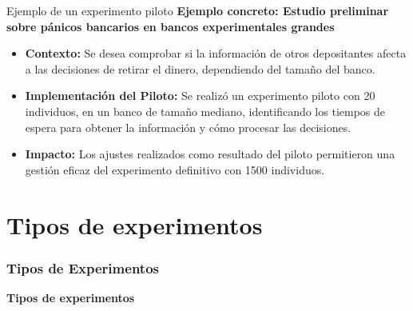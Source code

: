 ﻿\documentclass{beamer}
\begin{document}
\begin{frame}{Ejemplo de un experimento piloto}
\textbf{Ejemplo concreto: Estudio preliminar sobre pánicos bancarios en bancos experimentales grandes}
\begin{itemize}
    \item \textbf{Contexto:} Se desea comprobar si la información de otros depositantes afecta a las decisiones de retirar el dinero, dependiendo del tamaño del banco.
    \item \textbf{Implementación del Piloto:} Se realizó un experimento piloto con 20 individuos, en un banco de tamaño mediano, identificando los tiempos de espera para obtener la información y cómo procesar las decisiones.
    \item \textbf{Impacto:} Los ajustes realizados como resultado del piloto permitieron una gestión eficaz del experimento definitivo con 1500 individuos.
\end{itemize}
\end{frame}

\section{Tipos de experimentos}
\begin{frame}
    \frametitle{Tipos de Experimentos}
    \centering
    \textbf{\Large Tipos de experimentos}
    \vspace{0.5cm}
\end{frame}
\end{document}
